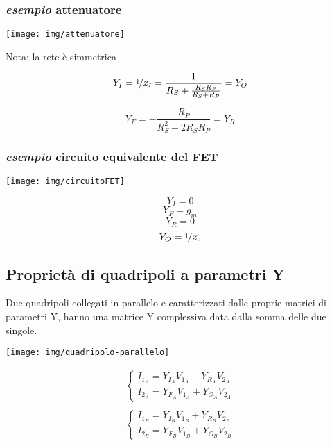 \subsubsection*{\textit{esempio} attenuatore}

\begin{multicols}{2}
	\texttt{[image: img/attenuatore]}
	
	Nota: la rete è simmetrica
	
	$$Y_I = \nicefrac{1}{Z_I} =
	\frac{1}{R_S + \frac{R_S R_P}{R_S+R_P}} = Y_O$$
	
	$$Y_F = -
	\frac{R_P}{R_S^2 + 2 R_S R_P} = Y_R$$
\end{multicols}

\subsubsection*{\textit{esempio} circuito equivalente del FET}
\begin{minipage}{0.5\linewidth}
	\texttt{[image: img/circuitoFET]}
\end{minipage}
\begin{minipage}{0.5\linewidth}
$$
Y_I = 0
$$
$$
Y_F = g_m
$$
$$
Y_R = 0
$$
$$
Y_O = \nicefrac{1}{Z_0}
$$
\end{minipage}

\subsection{Proprietà di quadripoli a parametri Y}\label{sec:quadripoli-parallelo}
Due quadripoli collegati in parallelo e caratterizzati dalle proprie matrici di parametri Y, hanno una	matrice Y complessiva data dalla somma delle due singole.

\begin{minipage}{.5\linewidth}
	\centering
	\texttt{[image: img/quadripolo-parallelo]}
\end{minipage}
\begin{minipage}{.5\linewidth}
\begin{align*}
\begin{cases}
I_{1_A} = Y_{I_A} V_{1_A}+ Y_{R_A}V_{2_A}\\
I_{2_A} = Y_{F_A} V_{1_A}+ Y_{O_A}V_{2_A}
\end{cases}\\\\
\begin{cases}
I_{1_B} = Y_{I_B} V_{1_B}+ Y_{R_B}V_{2_B}\\
I_{2_B} = Y_{F_B} V_{1_B}+ Y_{O_B}V_{2_B}
\end{cases}\\
\end{align*}
\end{minipage}

